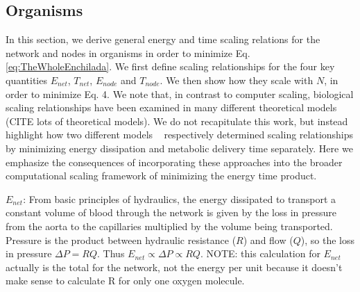 \documentclass[12pt]{article}
\begin{document}


\subsection{Organisms}
\label{sec:organisms}
%


In this section, we derive general energy and time scaling relations 
for the network and nodes in organisms in order to minimize Eq. \ref{eq:TheWholeEnchilada}.  
We first define scaling relationships for the four key quantities $E_{net}$, $T_{net}$, $E_{node}$ and $T_{node}$. We then show how they scale with $N$, in order to minimize Eq. 4. We note that, in contrast to computer scaling, biological scaling relationships have been examined in many different theoretical models (CITE lots of theoretical models). We do not recapitulate this work, but instead highlight how two different models ~\cite{west97, banavar10} respectively determined scaling relationships by minimizing energy dissipation and metabolic delivery time separately. Here we emphasize the consequences of incorporating these approaches into the broader computational scaling framework of minimizing the energy time product. 

$E_{net}$: From basic principles of hydraulics, the energy dissipated to
transport a constant volume of blood through the network
is given by the loss in pressure from the aorta to the capillaries
multiplied by the volume being transported.  Pressure is the product between
hydraulic resistance ($R$) and flow ($Q$), so the loss in pressure $\Delta P = RQ$.  Thus $E_{net}
\propto \Delta P \propto RQ$. NOTE: this calculation for $E_{net}$ actually is the total for the network, not the energy per unit because it doesn't make sense to calculate R for only one oxygen molecule. 
\end{document}
